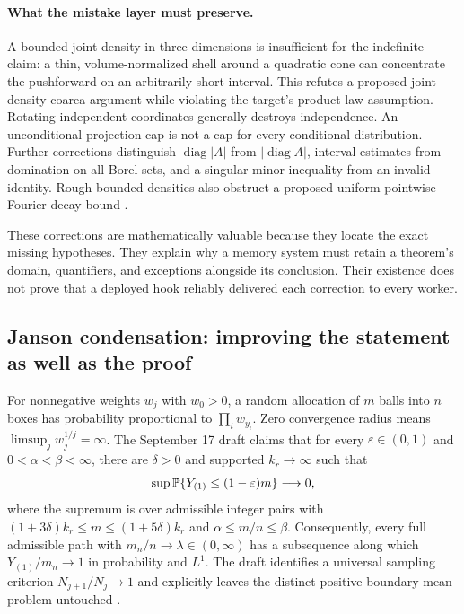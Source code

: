 \paragraph{What the mistake layer must preserve.}
A bounded joint density in three dimensions is insufficient for the indefinite claim: a thin, volume-normalized shell around a quadratic cone can concentrate the pushforward on an arbitrarily short interval. This refutes a proposed joint-density coarea argument while violating the target's product-law assumption. Rotating independent coordinates generally destroys independence. An unconditional projection cap is not a cap for every conditional distribution. Further corrections distinguish $\operatorname{diag}|A|$ from $|\operatorname{diag}A|$, interval estimates from domination on all Borel sets, and a singular-minor inequality from an invalid identity. Rough bounded densities also obstruct a proposed uniform pointwise Fourier-decay bound \citep{CaseQFORMScope2026}.

These corrections are mathematically valuable because they locate the exact missing hypotheses. They explain why a memory system must retain a theorem's domain, quantifiers, and exceptions alongside its conclusion. Their existence does not prove that a deployed hook reliably delivered each correction to every worker.



\subsection{Janson condensation: improving the statement as well as the proof}

For nonnegative weights $w_j$ with $w_0>0$, a random allocation of $m$ balls into $n$ boxes has probability proportional to $\prod_iw_{y_i}$. Zero convergence radius means $\limsup_j w_j^{1/j}=\infty$. The September 17 draft claims that for every $\varepsilon\in(0,1)$ and $0<\alpha<\beta<\infty$, there are $\delta>0$ and supported $k_r\to\infty$ such that
\[
\sup\mathbb{P}\{Y_{(1)}\leq(1-\varepsilon)m\}\longrightarrow0,
\]
where the supremum is over admissible integer pairs with
$(1+3\delta)k_r\leq m\leq(1+5\delta)k_r$ and $\alpha\leq m/n\leq\beta$.
Consequently, every full admissible path with $m_n/n\to\lambda\in(0,\infty)$ has a subsequence along which $Y_{(1)}/m_n\to1$ in probability and $L^1$. The draft identifies a universal sampling criterion $N_{j+1}/N_j\to1$ and explicitly leaves the distinct positive-boundary-mean problem untouched \citep{Janson2012,CaseJanson2026}.

